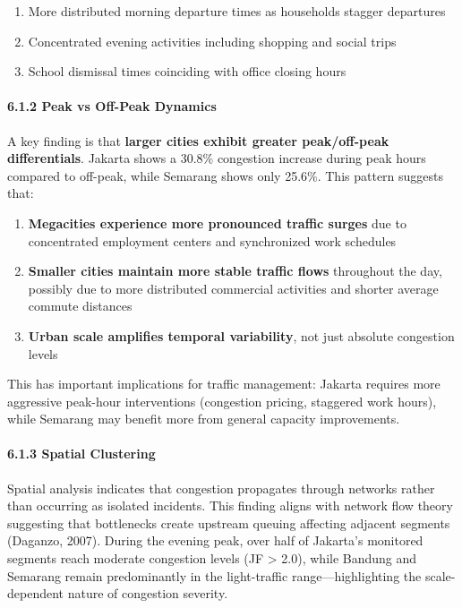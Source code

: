 \begin{enumerate}
\def\labelenumi{\arabic{enumi}.}
\tightlist
\item
  More distributed morning departure times as households stagger departures
\item
  Concentrated evening activities including shopping and social trips
\item
  School dismissal times coinciding with office closing hours
\end{enumerate}

\paragraph{6.1.2 Peak vs Off-Peak Dynamics}\label{peak-vs-off-peak-dynamics}

A key finding is that \textbf{larger cities exhibit greater peak/off-peak differentials}. Jakarta shows a 30.8\% congestion increase during peak hours compared to off-peak, while Semarang shows only 25.6\%. This pattern suggests that:

\begin{enumerate}
\def\labelenumi{\arabic{enumi}.}
\tightlist
\item
  \textbf{Megacities experience more pronounced traffic surges} due to concentrated employment centers and synchronized work schedules
\item
  \textbf{Smaller cities maintain more stable traffic flows} throughout the day, possibly due to more distributed commercial activities and shorter average commute distances
\item
  \textbf{Urban scale amplifies temporal variability}, not just absolute congestion levels
\end{enumerate}

This has important implications for traffic management: Jakarta requires more aggressive peak-hour interventions (congestion pricing, staggered work hours), while Semarang may benefit more from general capacity improvements.

\paragraph{6.1.3 Spatial Clustering}\label{spatial-clustering}

Spatial analysis indicates that congestion propagates through networks rather than occurring as isolated incidents. This finding aligns with network flow theory suggesting that bottlenecks create upstream queuing affecting adjacent segments (Daganzo, 2007). During the evening peak, over half of Jakarta's monitored segments reach moderate congestion levels (JF \textgreater{} 2.0), while Bandung and Semarang remain predominantly in the light-traffic range---highlighting the scale-dependent nature of congestion severity.

